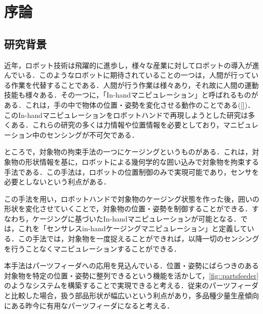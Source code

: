 \documentclass[a4paper,twoside,12pt,papersize, dvipdfmx]{iirthesis}
\begin{document}
    \newcommand{\figref}[1]{\figurename\ref{#1}}
    \newcommand{\tabref}[1]{\tablename\ref{#1}}
    \renewcommand{\eqref}[1]{式~(\ref{#1})}
    \newcommand{\chapref}[1]{\ref{#1}章}
    \newcommand{\secref}[1]{\ref{#1}節}
    \newcommand{\ssecref}[1]{\ref{#1}項}
    \newcommand{\appref}[1]{付録\ref{#1}}
\fi


\chapter{序論}\label{chap::intro}
\minitoc

\section{研究背景}\label{sec::intro::background}
近年，ロボット技術は飛躍的に進歩し，様々な産業に対してロボットの導入が進んでいる．このようなロボットに期待されていることの一つは，人間が行っている作業を代替することである．人間が行う作業は様々あり，それ故に人間の運動技能も様々ある．その一つに，「In-handマニピュレーション」と呼ばれるものがある．これは，手の中で物体の位置・姿勢を変化させる動作のことである(\figref{})．このIn-handマニピュレーションをロボットハンドで再現しようとした研究は多くある．これらの研究の多くは力情報や位置情報を必要としており，マニピュレーション中のセンシングが不可欠である．\par

ところで，対象物の拘束手法の一つにケージング\cite{rimon1999}というものがある．これは，対象物の形状情報を基に，ロボットによる幾何学的な囲い込みで対象物を拘束する手法である．この手法は，ロボットの位置制御のみで実現可能であり，センサを必要としないという利点がある．\par

この手法を用い，ロボットハンドで対象物のケージング状態を作った後，囲いの形状を変化させていくことで，対象物の位置・姿勢を制御することができる．すなわち，ケージングに基づいたIn-handマニピュレーションが可能となる．\cite{komiyama2020}では，これを「センサレスin-handケージングマニピュレーション」と定義している．この手法では，対象物を一度捉えることができれば，以降一切のセンシングを行うことなくマニピュレーションすることができる．\par

本手法はパーツフィーダへの応用を見込んでいる．位置・姿勢にばらつきのある対象物を特定の位置・姿勢に整列できるという機能を活かして，\figref{fig::partsfeeder}のようなシステムを構築することで実現できると考える．従来のパーツフィーダと比較した場合，扱う部品形状が幅広いという利点があり，多品種少量生産傾向にある昨今に有用なパーツフィーダになると考える．\par 
\end{document}

